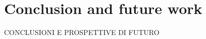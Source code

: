 \chapter{Conclusion and future work}
\label{sec:conclusion_future_work}

CONCLUSIONI E PROSPETTIVE DI FUTURO